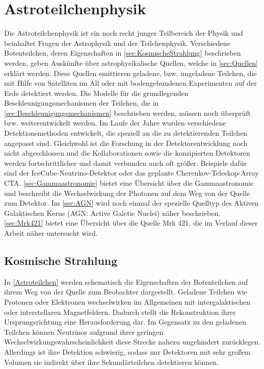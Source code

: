 \chapter{Astroteilchenphysik}
\label{chapter:Astroteilchenphysik}
Die Astroteilchenphysik ist ein noch recht junger Teilbereich der Physik und beinhaltet Fragen der Astrophysik und der Teilchenphysik.
Verschiedene Botenteilchen, deren Eigenschaften in \autoref{sec:KosmischeStrahlung} beschrieben werden, geben Auskünfte über astrophysikalische Quellen, welche in \autoref{sec:Quellen} erklärt werden.
Diese Quellen emittieren geladene, bzw.  ungeladene Teilchen, die mit Hilfe von Satelliten im All oder mit bodengebundenen Experimenten auf der Erde detektiert werden.
Die Modelle für die grundlegenden Beschleunigungsmechanismen der Teilchen, die in \autoref{sec:Beschleunigungsmechanismen} beschrieben werden, müssen noch überprüft bzw. weiterentwickelt werden.
Im Laufe der Jahre wurden verschiedene Detektionsmethoden entwickelt, die speziell an die zu detektierenden Teilchen angepasst sind.
Gleichwohl ist die Forschung in der Detektorentwicklung noch nicht abgeschlossen und die Kollaborationen sowie die konzipierten Detektoren werden fortschrittlicher und damit verbunden auch oft größer.
Beispiele dafür sind der IceCube-Neutrino-Detektor oder das geplante Cherenkov-Teleskop-Array CTA.
\autoref{sec:Gammaastronomie} bietet eine Übersicht über die Gammaastronomie und beschreibt die Wechselwirkung der Photonen auf dem Weg von der Quelle zum Detektor. 
Im \autoref{sec:AGN} wird noch einmal der spezielle Quelltyp des Aktiven Galaktischen Kerns (AGN: Active Galctic Nuclei) näher beschrieben.
\autoref{sec:Mrk421} bietet eine Übersicht über die Quelle Mrk 421, die im Verlauf dieser Arbeit näher untersucht wird.

\section{Kosmische Strahlung}
\label{sec:KosmischeStrahlung}
In \autoref{Astroteilchen} werden schematisch die Eigenschaften der Botenteilchen auf ihrem Weg von der Quelle zum Beobachter dargestellt.
Geladene Teilchen wie Protonen oder Elektronen wechselwirken im Allgemeinen mit intergalaktischen oder interstellaren Magnetfeldern.
Dadurch stellt die Rekonstruktion ihrer Ursprungsrichtung eine Herausforderung dar.
Im Gegensatz zu den geladenen Teilchen können Neutrinos aufgrund ihrer geringen Wechselwirkungswahrscheinlichkeit diese Strecke nahezu ungehindert zurücklegen. 
Allerdings ist ihre Detektion schwierig, sodass nur Detektoren mit sehr großem Volumen sie indirekt über ihre Sekundärteilchen detektieren können.


